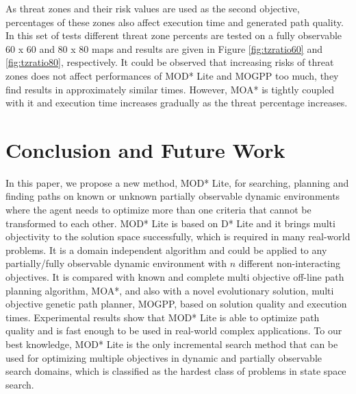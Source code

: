 \documentclass[10pt,journal]{IEEEtran}
\begin{document}
As threat zones and their risk values are used as the second objective, percentages of these zones also affect execution time and generated path quality. In this set of tests different threat zone percents are tested on a fully observable 60 x 60 and 80 x 80 maps and results are given in Figure \ref{fig:tzratio60} and \ref{fig:tzratio80}, respectively. It could be observed that increasing risks of threat zones does not affect performances of  MOD* Lite and MOGPP too much, they find results in approximately similar times. However, MOA* is tightly coupled with it and execution time increases gradually as the threat percentage increases.

\section{Conclusion and Future Work}
\label{chapter:conclusion}


In this paper, we propose a new method, MOD* Lite, for searching, planning and finding paths on known or unknown partially observable dynamic environments  where the agent needs to optimize more than one criteria that cannot be transformed to each other.  MOD* Lite is based on D* Lite and it brings multi objectivity to the solution space successfully, which is required in many real-world problems. It is a domain independent algorithm and could be applied to any partially/fully observable dynamic environment with $n$ different non-interacting objectives. It is compared with known and complete multi objective off-line path planning algorithm, MOA*, and also with a novel evolutionary solution, multi objective genetic path planner, MOGPP, based on solution quality and execution times. Experimental results show that MOD* Lite is able to optimize path quality and is fast enough to be used in real-world complex applications. To our best knowledge, MOD* Lite is the only incremental search method that can be used for optimizing multiple objectives in dynamic and partially observable search domains, which is classified as the hardest class of problems in state space search.
\end{document}

